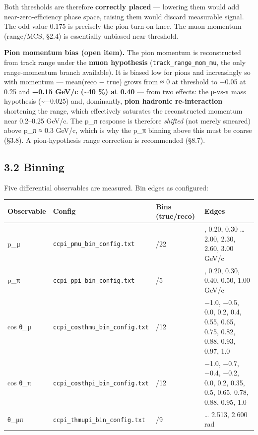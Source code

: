 \documentclass[11pt]{article}
\begin{document}
Both thresholds are therefore \textbf{correctly placed} — lowering them would add near-zero-efficiency phase space, raising them would discard measurable signal. The odd value 0.175 is precisely the pion turn-on knee. The muon momentum (range/MCS, §2.4) is essentially unbiased near threshold.

\textbf{Pion momentum bias (open item).} The pion momentum is reconstructed from track range under the \textbf{muon hypothesis} (\texttt{track\_range\_mom\_mu}, the only range-momentum branch available). It is biased low for pions and increasingly so with momentum — mean(reco − true) grows from ≈ 0 at threshold to −0.05 at 0.25 and \textbf{−0.15 GeV/c (\textasciitilde{}40 \%) at 0.40} — from two effects: the μ-vs-π mass hypothesis (\textasciitilde{}−0.025) and, dominantly, \textbf{pion hadronic re-interaction} shortening the range, which effectively saturates the reconstructed momentum near 0.2–0.25 GeV/c. The p\_π response is therefore \emph{shifted} (not merely smeared) above p\_π ≈ 0.3 GeV/c, which is why the p\_π binning above this must be coarse (§3.8). A pion-hypothesis range correction is recommended (§8.7).

\subsection*{3.2 Binning}

Five differential observables are measured. Bin edges as configured:

\begin{tabularx}{\textwidth}{|>{\raggedright\arraybackslash}X|>{\raggedright\arraybackslash}X|>{\raggedright\arraybackslash}X|>{\raggedright\arraybackslash}X|}
\hline
\textbf{Observable} & \textbf{Config} & \textbf{Bins (true/reco)} & \textbf{Edges} \\
\hline
p\_μ & \texttt{ccpi\_pmu\_bin\_config.txt} & 23/22 & 0.15, 0.20, 0.30 … 2.00, 2.30, 2.60, 3.00 GeV/c \\
p\_π & \texttt{ccpi\_ppi\_bin\_config.txt} & 6/5 & 0.175, 0.20, 0.30, 0.40, 0.50, 1.00 GeV/c \\
cos θ\_μ & \texttt{ccpi\_costhmu\_bin\_config.txt} & 13/12 & −1.0, −0.5, 0.0, 0.2, 0.4, 0.55, 0.65, 0.75, 0.82, 0.88, 0.93, 0.97, 1.0 \\
cos θ\_π & \texttt{ccpi\_costhpi\_bin\_config.txt} & 13/12 & −1.0, −0.7, −0.4, −0.2, 0.0, 0.2, 0.35, 0.5, 0.65, 0.78, 0.88, 0.95, 1.0 \\
θ\_μπ & \texttt{ccpi\_thmupi\_bin\_config.txt} & 10/9 & 0.0 … 2.513, 2.600 rad \\
\hline
\end{tabularx}
\end{document}
